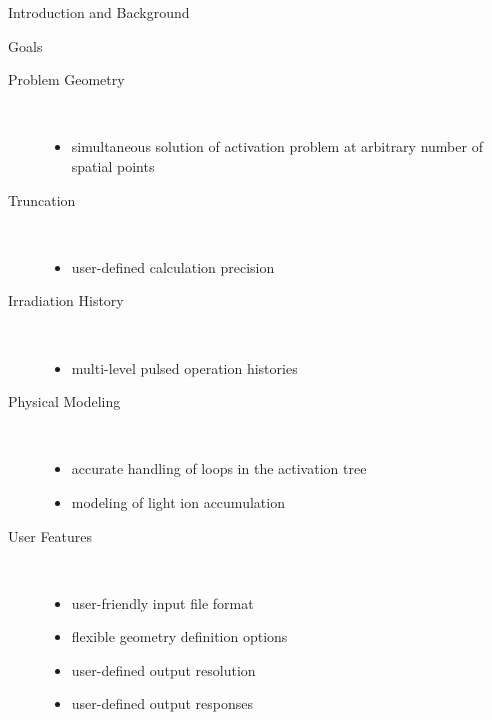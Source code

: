 \begin{chapter}{Introduction and Background}
\begin{section}{Goals}
    \enlargethispage*{\baselineskip}

    \renewcommand{\baselinestretch}{1.24}\normalsize
    \begin{description}
    \item[Problem Geometry]\ \\
      \vspace*{-1cm}
      \begin{itemize}
      \item simultaneous solution of activation problem at arbitrary
        number of spatial points
      \end{itemize}
    \item[Truncation]\ \\
      \vspace*{-1cm}
      \begin{itemize}
      \item user-defined calculation precision
      \end{itemize}
    \item[Irradiation History]\ \\
      \vspace*{-1cm}
      \begin{itemize}
      \item multi-level pulsed operation histories
      \end{itemize}
    \item[Physical Modeling]\ \\
      \vspace*{-1cm}
      \begin{itemize}
      \item accurate handling of loops in the activation tree
      \item modeling of light ion accumulation
      \end{itemize}
    \item[User Features]\ \\
      \vspace*{-1cm}
      \begin{itemize}
      \item user-friendly input file format
      \item flexible geometry definition options
      \item user-defined output resolution
      \item user-defined output responses
      \end{itemize}
    \end{description}
    

\end{section}
\end{chapter}
